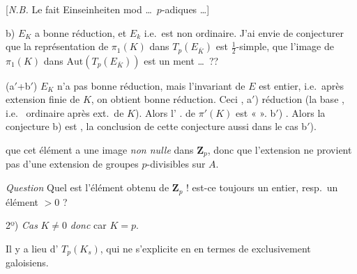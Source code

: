 \documentclass[11pt,a4paper]{article}
\begin{document}
[\emph{N.B.} Le fait \ill{} \ill{} \ill{} Einseinheiten  \ill{}
 \ill{} mod \struck{\ill{}} 
\ill{} \ill{} \ill{} \ldots\ $p$-adiques \ldots]

\quad b) $E_K$ a bonne réduction, et $E_k$ \ill{} i.e.\ est non ordinaire.
J'ai envie de conjecturer que  la représentation de $\pi_1(K)$
dans $T_p(E_{\overline{K}})$ est $\frac12$-simple,  que
l'image de $\pi_1(K)$ dans $\mathrm{Aut}(T_p(E_{\overline{K}}))$ est un
 \ill{}ment \ldots\ ??

(a$'$+b$'$) $E_K$ n'a pas  bonne réduction, mais l'invariant de $E$
est entier, i.e.\ après extension finie de $K$, on obtient bonne réduction.
Ceci  \ill{} \ill{} , a$'$) réduction \ill{} (la base
\ill{}, i.e.\ \ill{} \ill{} ordinaire après ext.\ de $K$). Alors
l' \ill{} \ill{} \ill{} \ill{} \ill{}. de
$\pi'(K)$ est « \ill{} ». b$'$) \ill{} \ill{} \ill{} \ill{}. Alors
 la conjecture  b) est \ill{}, la conclusion de
cette conjecture  aussi dans le cas b$'$).

que cet élément a une image \emph{non nulle} dans $\mathbf{Z}_p$, donc que
l'extension ne provient pas d'une extension de groupes $p$-divisibles sur
\emph{$A$}.

\emph{Question} Quel est l'élément obtenu de $\mathbf{Z}_p$ ! est-ce toujours
un entier, resp.\ un élément $>0$ ?

2º) \emph{Cas}  $K\neq 0$ \emph{donc} car $K=p$.

\struck{\ill{}} Il y a lieu d' \ill{} $T_p(K_s)$, qui ne
s'explicite  en \ill{} en termes de 
exclusivement \ill{} galoisiens.
\end{document}
